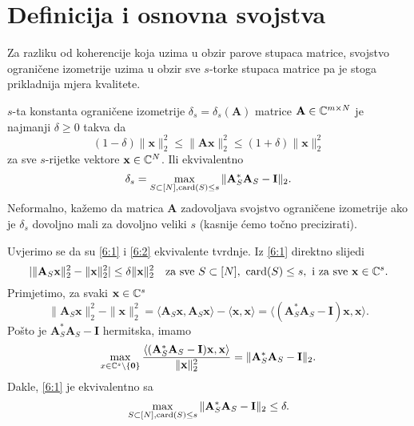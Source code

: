 \documentclass[a4paper,twoside,12pt]{memoir} %
\newcommand{\vect}[1]{\mathbf{#1}}
\renewcommand{\vec}{\vect}
\newcommand{\card}{\text{\normalfont{card}}}
\newcommand{\norm}[1]{\|{#1}\|}
\begin{document}
\section[Definicija i osnovna svojstva][Definicija i osnovna svojstva]{Definicija i osnovna svojstva}
Za razliku od koherencije koja uzima u obzir parove stupaca matrice, svojstvo ograni\v{c}ene izometrije uzima u obzir sve $s$-torke stupaca matrice pa je stoga prikladnija mjera kvalitete.
\begin{defn}\label{defn:6:1}
    $s$-ta konstanta ograni\v{c}ene izometrije $\delta_s = \delta_s(\vec A)$ matrice $\vec A \in \C^{m \times N}$ je najmanji $\delta \geq 0$ takva da
    \begin{equation}\label{6:1}
        (1-\delta) \norm{\vec x}_2^2 \leq \norm{\vec{Ax}}_2^2 \leq (1+\delta)\norm{\vec x}_2^2 
    \end{equation}
    za sve $s$-rijetke vektore $\vec x \in \C^N$. Ili ekvivalentno
    \begin{equation}\label{6:2}
        \delta_s = \max_{S \subset [N], \card(S) \leq s} \norm{\vec A^*_S \vec A_S - \vec I}_2.
    \end{equation}
    Neformalno, ka\v{z}emo da matrica $\vec A$ zadovoljava svojstvo ograni\v{c}ene izometrije ako je $\delta_s$ dovoljno mali za dovoljno veliki $s$ (kasnije \'cemo to\v{c}no precizirati).
\end{defn}
Uvjerimo se da su \eqref{6:1} i \eqref{6:2} ekvivalente tvrdnje. Iz \eqref{6:1} direktno slijedi
\begin{equation*}
    | \norm{\vec A_S \vec x}_2^2 - \norm{\vec x}_2^2| \leq \delta \norm{\vec x}_2^2 \quad \text{za sve } S \subset [N],\ \card(S) \leq s,\ \text{i za sve } \vec x \in \C^s.
\end{equation*}
Primjetimo, za svaki $\vec x \in \C^s$
\begin{equation*}
    \norm{\vec A_S \vec x}_2^2 - \norm{\vec x}_2^2 = \langle \vec A_S \vec x, \vec A_S \vec x \rangle - \langle \vec x, \vec x \rangle = \langle (\vec A_S^* \vec A_S - \vec I )\vec x, \vec x\rangle.
\end{equation*}
Po\v{s}to je $\vec A_S^* \vec A_S - \vec I$ hermitska, imamo
\begin{equation*}
    \max_{x \in \C^s \backslash \{\vec 0\}} \frac{\langle (\vec A_S^* \vec A_S - \vec I)\vec x, \vec x \rangle}{\norm{\vec x}_2^2} = \norm{\vec A_S^* \vec A_S - \vec I}_2.
\end{equation*}
Dakle, \eqref{6:1} je ekvivalentno sa
\begin{equation*}
    \max_{S \subset [N], \card(S) \leq s} \norm{\vec A^*_S \vec A_S - \vec I}_2 \leq \delta. 
\end{equation*}
\end{document}
